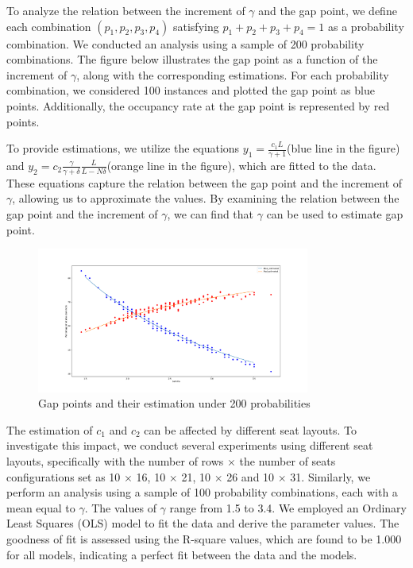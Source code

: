 To analyze the relation between the increment of $\gamma$ and the gap point, we define each combination $(p_1, p_2, p_3, p_4)$ satisfying $p_1 + p_2 + p_3 + p_4 = 1$ as a probability combination. We conducted an analysis using a sample of 200 probability combinations. The figure below illustrates the gap point as a function of the increment of $\gamma$, along with the corresponding estimations. For each probability combination, we considered 100 instances and plotted the gap point as blue points. Additionally, the occupancy rate at the gap point is represented by red points.

To provide estimations, we utilize the equations $y_1 = \frac{c_1 L}{\gamma +1}$(blue line in the figure) and $y_2 = c_2 \frac{\gamma}{\gamma + \delta} \frac{L}{L-N \delta}$(orange line in the figure), which are fitted to the data. These equations capture the relation between the gap point and the increment of $\gamma$, allowing us to approximate the values. By examining the relation between the gap point and the increment of $\gamma$, we can find that $\gamma$ can be used to estimate gap point.

\begin{figure}[ht]
  \centering
    \includegraphics[width=0.8\textwidth]{./Figures/re2.pdf}
  \caption{Gap points and their estimation under 200 probabilities}
\end{figure}



The estimation of $c_1$ and $c_2$ can be affected by different seat layouts. To investigate this impact, we conduct several experiments using different seat layouts, specifically with the number of rows $\times$ the number of seats configurations set as 10 $\times$ 16, 10 $\times$ 21, 10 $\times$ 26 and 10 $\times$ 31. Similarly, we perform an analysis using a sample of 100 probability combinations, each with a mean equal to $\gamma$. The values of $\gamma$ range from 1.5 to 3.4. We employed an Ordinary Least Squares (OLS) model to fit the data and derive the parameter values. The goodness of fit is assessed using the R-square values, which are found to be 1.000 for all models, indicating a perfect fit between the data and the models.

